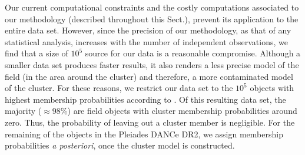 Our current computational constraints and the costly computations associated to our methodology (described throughout this Sect.), prevent its application to the entire data set. However, since the precision of our methodology, as that of any statistical analysis, increases with the number of independent observations, we find that a size of $10^5$ source for our data is a reasonable compromise. Although a smaller data set produces faster results, it also renders a less precise model of the field (in the area around the cluster) and therefore, a more contaminated model of the cluster. For these reasons, we restrict our data set to the $10^5$ objects with highest membership probabilities according to \citet{Bouy2015}. Of this resulting data set, the majority ($\approx$98\%) are field objects with cluster membership probabilities around zero. Thus, the probability of leaving out a cluster member is negligible. For the remaining of the objects in the Pleiades DANCe DR2, we assign membership probabilities \emph{a posteriori}, once the cluster model is constructed.



